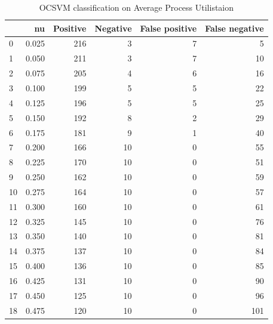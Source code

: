 \documentclass[a4paper,twoside,12pt]{book}
\begin{document}
\begin{appendices}

\begin{table}
	\centering
	\caption{OCSVM classification on Average Process Utilistaion}
	\label{id:tab:OCSVMonCombined}
	\begin{tabular}{lrrrrr}
		\toprule
		{} &     nu &  Positive &  Negative &  False positive &  False negative \\
		\midrule
		0  &  0.025 &       216 &         3 &               7 &               5 \\
		1  &  0.050 &       211 &         3 &               7 &              10 \\
		2  &  0.075 &       205 &         4 &               6 &              16 \\
		3  &  0.100 &       199 &         5 &               5 &              22 \\
		4  &  0.125 &       196 &         5 &               5 &              25 \\
		5  &  0.150 &       192 &         8 &               2 &              29 \\
		6  &  0.175 &       181 &         9 &               1 &              40 \\
		7  &  0.200 &       166 &        10 &               0 &              55 \\
		8  &  0.225 &       170 &        10 &               0 &              51 \\
		9  &  0.250 &       162 &        10 &               0 &              59 \\
		10 &  0.275 &       164 &        10 &               0 &              57 \\
		11 &  0.300 &       160 &        10 &               0 &              61 \\
		12 &  0.325 &       145 &        10 &               0 &              76 \\
		13 &  0.350 &       140 &        10 &               0 &              81 \\
		14 &  0.375 &       137 &        10 &               0 &              84 \\
		15 &  0.400 &       136 &        10 &               0 &              85 \\
		16 &  0.425 &       131 &        10 &               0 &              90 \\
		17 &  0.450 &       125 &        10 &               0 &              96 \\
		18 &  0.475 &       120 &        10 &               0 &             101 \\

\end{tabular}
\end{table}
\end{appendices}
\end{document}
